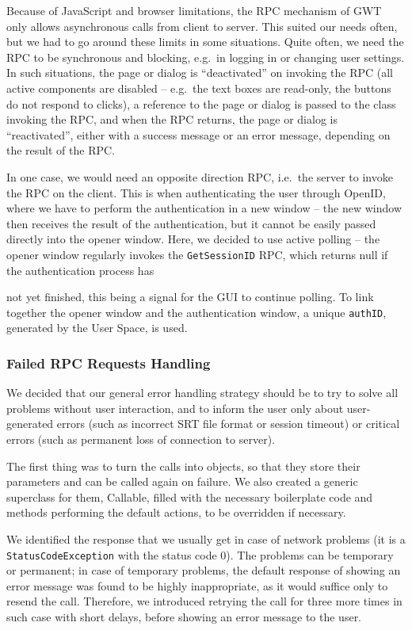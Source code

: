 Because of JavaScript and browser limitations, the RPC mechanism of GWT only allows asynchronous calls from client to server. This suited our needs often, but we had to go around these limits in some situations. Quite often, we need the RPC to be synchronous and blocking, e.g.\ in logging in or changing user settings. In such situations, the page or dialog is ``deactivated'' on invoking the RPC (all active components are disabled -- e.g.\ the text boxes are read-only, the buttons do not respond to clicks), a reference to the page or dialog is passed to the class invoking the RPC, and when the RPC returns, the page or dialog is ``reactivated'', either with a success message or an error message, depending on the result of the RPC.

In one case, we would need an opposite direction RPC, i.e.\ the server to invoke the RPC on the client. This is when authenticating the user through OpenID, where we have to perform the authentication in a new window -- the new window then receives the result of the authentication, but it cannot be easily passed directly into the opener window. Here, we decided to use active polling -- the opener window regularly invokes the {\tt GetSessionID} RPC, which returns null if the authentication process has{ not yet finished, this being a signal for the GUI to continue polling. To link together the opener window and the authentication window, a unique {\tt authID}, generated by the User Space, is used.

\subsubsection{Failed RPC Requests Handling}

We decided that our general error handling strategy should be to try to solve all problems without user interaction, and to inform the user only about user-generated errors (such as incorrect SRT file format or session timeout) or critical errors (such as permanent loss of connection to server).

The first thing was to turn the calls into objects, so that they store their parameters and can be called again on failure. We also created a generic superclass for them, Callable, filled with the necessary boilerplate code and methods performing the default actions, to be overridden if necessary.

We identified the response that we usually get in case of network problems (it is a {\tt StatusCodeException} with the status code 0). The problems can be temporary or permanent; in case of temporary problems, the default response of showing an error message was found to be highly inappropriate, as it would suffice only to resend the call. Therefore, we introduced retrying the call for three more times in such case with short delays, before showing an error message to the user.

}
